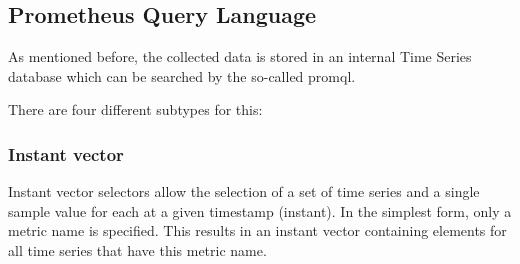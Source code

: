 \subsection{Prometheus Query Language}
As mentioned before, the collected data is stored in an internal Time Series database  which can be searched by the so-called \gls{promql}.

There are four different subtypes for this:
\subsubsection{Instant vector}
Instant vector selectors allow the selection of a set of time series and a single sample value for each at a given timestamp (instant). In the simplest form, only a metric name is specified. This results in an instant vector containing elements for all time series that have this metric name. 

